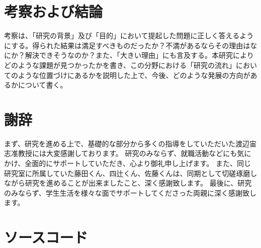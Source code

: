 \documentclass[titlepage]{jsreport}
\begin{document}
\chapter{考察および結論} \label{chap:summary}

考察は、「研究の背景」及び「目的」において提起した問題に正しく答えるようにする。得られた結果は満足すべきものだったか？不満があるならその理由はなにか？解決できそうなのか？また、「大きい理由」にも言及する。本研究によりどのような課題が見つかったかを書き、この分野における「研究の流れ」においてのような位置づけにあるかを説明した上で、今後、どのような発展の方向があるかについて書く。

\chapter*{謝辞}
まず、研究を進める上で、基礎的な部分から多くの指導をしていただいた渡辺宙志准教授には大変感謝しております。
研究のみならず、就職活動などにも気にかけ、全面的にサポートしていただき、心より御礼申し上げます。
また、同じ研究室に所属していた藤田くん、四辻くん、佐藤くんは、同期として切磋琢磨しながら研究を進めることが出来ましたこと、深く感謝致します。
最後に、研究のみならず、学生生活を様々な面でサポートしてくださった両親に深く感謝致します。

\appendix

\chapter{ソースコード}




\end{document}
